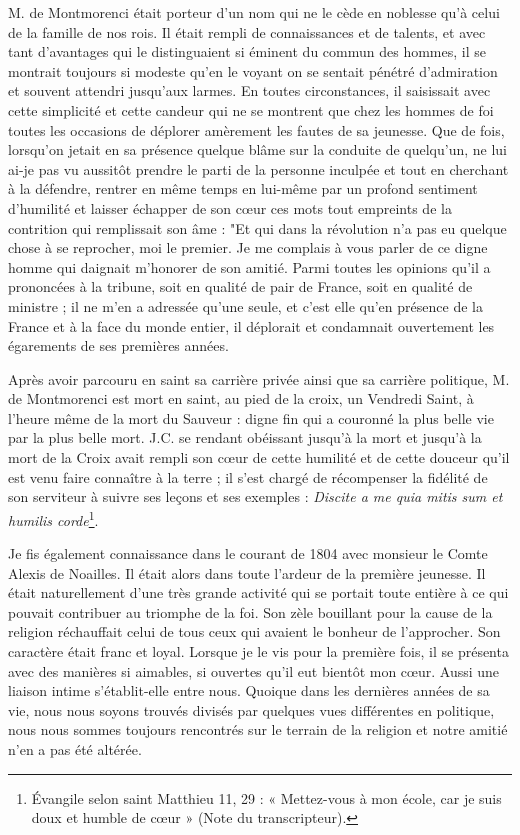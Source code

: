 \documentclass[11pt,a4paper]{report}
\begin{document}
M. de Montmorenci était porteur d'un nom qui ne le cède en noblesse qu'à celui de la famille de nos rois. Il était rempli de connaissances et de talents, et avec tant d'avantages qui le distinguaient si éminent du commun des hommes, il se montrait toujours si modeste qu'en le voyant on se sentait pénétré d'admiration et souvent attendri jusqu'aux larmes. En toutes circonstances, il saisissait avec cette simplicité et cette candeur qui ne se montrent que chez les hommes de foi toutes les occasions de déplorer amèrement les fautes de sa jeunesse. Que de fois, lorsqu'on jetait en sa présence quelque blâme sur la conduite de quelqu'un, ne lui ai-je pas vu aussitôt prendre le parti de la personne inculpée et tout en cherchant à la défendre, rentrer en même temps en lui-même par un profond sentiment d'humilité et laisser échapper de son cœur ces mots tout empreints de la contrition qui remplissait son âme : "Et qui dans la révolution n'a pas eu quelque chose à se reprocher, moi le premier. Je me complais à vous parler de ce digne homme qui daignait m'honorer de son amitié. Parmi toutes les opinions qu'il a prononcées à la tribune, soit en qualité de pair de France, soit en qualité de ministre ; il ne m'en a adressée qu'une seule, et c'est elle qu'en présence de la France et à la face du monde entier, il déplorait et condamnait ouvertement les égarements de ses premières années.

Après avoir parcouru en saint sa carrière privée ainsi que sa carrière politique, M. de Montmorenci est mort en saint, au pied de la croix, un Vendredi Saint, à l'heure même de la mort du Sauveur : digne fin qui a couronné la plus belle vie par la plus belle mort. J.C. se rendant obéissant jusqu'à la mort et jusqu'à la mort de la Croix avait rempli son cœur de cette humilité et de cette douceur qu'il est venu faire connaître à la terre ; il s'est chargé de récompenser la fidélité de son serviteur à suivre ses leçons et ses exemples : \textit{Discite a me quia mitis sum et humilis corde}\footnote{Évangile selon saint Matthieu 11, 29 : « Mettez-vous à mon école, car je suis doux et humble de cœur » (Note du transcripteur).}.

Je fis également connaissance dans le courant de 1804 avec monsieur le Comte Alexis de Noailles. Il était alors dans toute l'ardeur de la première jeunesse. Il était naturellement d'une très grande activité qui se portait toute entière à ce qui pouvait contribuer au triomphe de la foi. Son zèle bouillant pour la cause de la religion réchauffait celui de tous ceux qui avaient le bonheur de l'approcher. Son caractère était franc et loyal. Lorsque je le vis pour la première fois, il se présenta avec des manières si aimables, si ouvertes qu'il eut bientôt mon cœur. Aussi une liaison intime s'établit-elle entre nous. Quoique dans les dernières années de sa vie, nous nous soyons trouvés divisés par quelques vues différentes en politique, nous nous sommes toujours rencontrés sur le terrain de la religion et notre amitié n'en a pas été altérée.
\end{document}
